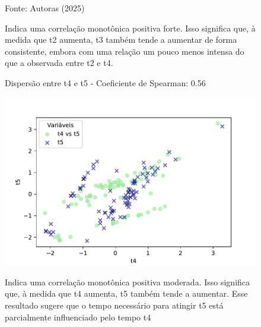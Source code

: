 \begin{figure}[h]
\begin{minipage}[b]{0.45\linewidth}
        \vspace{0.3cm}
        \caption{Indica uma correlação monotônica positiva forte. Isso significa que, à medida que t2 aumenta, t3 também tende a aumentar de forma consistente, embora com uma relação um pouco menos intensa do que a observada entre t2 e t4.}
        \begin{minipage}{\linewidth}
            \centering
            \scriptsize{Fonte: Autoras (2025)}
        \end{minipage}
    \end{minipage}
\end{figure}
\FloatBarrier

\begin{figure}[h]
    \captionsetup{font=footnotesize, justification=centering, labelsep=period, position=above}
    \centering
    \begin{minipage}[b]{0.45\linewidth}
        \caption{Dispersão entre t4 e t5 - Coeficiente de Spearman: 0.56}
        \label{fig:t4-t5}
        \centering
        \includegraphics[scale=0.48]{figuras/Spearman/t4-t5.pdf}
        \vspace{0.3cm}
        \caption{Indica uma correlação monotônica positiva moderada. Isso significa que, à medida que t4 aumenta, t5 também tende a aumentar. Esse resultado sugere que o tempo necessário para atingir t5 está parcialmente influenciado pelo tempo t4}
        \begin{minipage}{\linewidth}
            \centering
        \end{minipage}
    \end{minipage}
    \hspace{0.05\linewidth}
    \begin{minipage}[b]{0.45\linewidth}

\end{minipage}
\end{figure}
